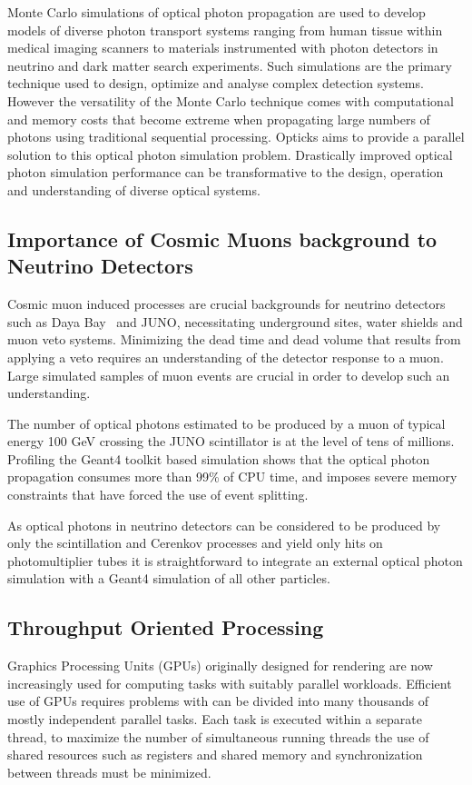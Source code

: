 \documentclass{webofc}
\begin{document}
Monte Carlo simulations of optical photon propagation 
are used to develop models of diverse photon transport systems 
ranging from human tissue within medical imaging scanners 
to materials instrumented with photon detectors in neutrino 
and dark matter search experiments. 
Such simulations are the primary technique used to design, optimize 
and analyse complex detection systems. However the versatility 
of the Monte Carlo technique comes with computational and memory costs 
that become extreme when propagating large numbers of photons
using traditional sequential processing. Opticks aims to provide a 
parallel solution to this optical photon simulation problem.  Drastically 
improved optical photon simulation performance can be transformative 
to the design, operation and understanding of diverse optical systems.


\subsection{Importance of Cosmic Muons background to Neutrino Detectors}

Cosmic muon induced processes are crucial backgrounds for neutrino
detectors such as Daya Bay~\cite{dyb} and JUNO\cite{juno},
necessitating underground sites, water shields and muon veto systems.
Minimizing the dead time and dead volume that results from applying
a veto requires an understanding of the detector response to a muon.
Large simulated samples of muon events are crucial in order to
develop such an understanding.

The number of optical photons estimated to be produced by a muon of
typical energy 100 GeV crossing the JUNO scintillator is at the level of tens of millions.
Profiling the Geant4 toolkit based simulation shows that the optical photon propagation 
consumes more than 99\% of CPU time, and imposes severe memory constraints that have forced
the use of event splitting.  

As optical photons in neutrino detectors can be considered to be produced
by only the scintillation and Cerenkov processes and yield only hits
on photomultiplier tubes it is straightforward to integrate an
external optical photon simulation with a Geant4 simulation of all other particles.


\subsection{Throughput Oriented Processing}

Graphics Processing Units (GPUs) originally designed for rendering 
are now increasingly used for computing tasks with suitably parallel workloads.
Efficient use of GPUs requires problems with can be divided into 
many thousands of mostly independent parallel tasks.  Each task 
is executed within a separate thread, to maximize the number of simultaneous 
running threads the use of shared resources such as registers and shared 
memory and synchronization between threads must be minimized.
\end{document}

